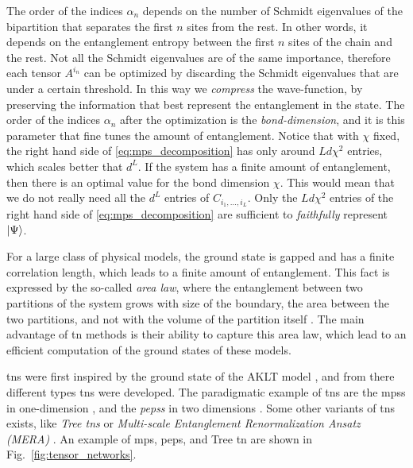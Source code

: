 The order of the indices $\alpha_n$ depends on the number of Schmidt eigenvalues of the bipartition that separates the first $n$ sites from the rest.
In other words, it depends on the entanglement entropy between the first $n$ sites of the chain and the rest.
Not all the Schmidt eigenvalues are of the same importance, therefore each tensor $A^{i_n}$ can be optimized by discarding the Schmidt eigenvalues that are under a certain threshold.
In this way we \emph{compress} the wave-function, by preserving the information that best represent the entanglement in the state.
The order of the indices $\alpha_n$ after the optimization is the \emph{bond-dimension}, and it is this parameter that fine tunes the amount of entanglement.
Notice that with $\chi$ fixed, the right hand side of \eqref{eq:mps_decomposition} has only around $L d \chi^2$ entries, which scales better that $d^L$.
If the system has a finite amount of entanglement, then there is an optimal value for the bond dimension $\chi$.
This would mean that we do not really need all the $d^L$ entries of $C_{i_1, \dots, i_L}$.
Only the $L d \chi^2$ entries of the right hand side of \eqref{eq:mps_decomposition} are sufficient to \emph{faithfully} represent $\ket{\Psi}$.

For a large class of physical models, the ground state is gapped and has a finite correlation length, which leads to a finite amount of entanglement.
This fact is expressed by the so-called \emph{area law}, where the entanglement between two partitions of the system grows with size of the boundary, the area between the two partitions, and not with the volume of the partition itself \cite{vidal2003arealaw, calabrese2004qft, calabrese2009cft, srednicki1993area, plenio2005area}.
The main advantage of \ac{tn} methods is their ability to capture this area law, which lead to an efficient computation of the ground states of these models.

\Acp{tn} were first inspired by the ground state of the AKLT model \cite{affleck1987aklt}, and from there different types \acp{tn} were developed.
The paradigmatic example of \acp{tn} are the \acp{mps} in one-dimension \cite{vidal2008simulation, schollwock2011dmrg}, and the \emph{\acp{peps}} in two dimensions \cite{verstraete2004algo, jordan2008ipeps}.
Some other variants of \acp{tn} exists, like \emph{Tree \acp{tn}} \cite{tagliacozzo2009tree, fannes1992trees} or \emph{Multi-scale Entanglement Renormalization Ansatz (MERA)} \cite{evenbly2013mera, vidal2007entanglement, evenbly2009entanglement}.
An example of \ac{mps}, \ac{peps}, and Tree \ac{tn} are shown in Fig.~\ref{fig:tensor_networks}.

